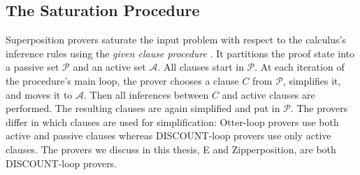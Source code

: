 \subsection{The Saturation Procedure}
\label{sec:pre:saturation}

Superposition provers saturate the input problem with respect to the calculus's
inference rules using the \emph{given clause procedure}
\cite{mcw-1997-otter,adf-1995-discount}. It partitions the proof state into a
passive set $\mathcal{P}$ and an active set $\mathcal{A}$. All clauses start in
$\mathcal{P}$. At each iteration of the procedure's main loop, the prover
chooses a clause $C$ from $\mathcal{P}$, simplifies it, and moves it to
$\mathcal{A}$. Then all inferences between $C$ and active clauses are performed.
The resulting clauses are again simplified and put in $\mathcal{P}$.
The provers differ in which clauses are used for simplification: Otter-loop
\cite{mcw-1997-otter} provers use both active and passive clauses whereas
DISCOUNT-loop \cite{adf-1995-discount} provers use only active clauses.
The provers we discuss in this thesis, E and Zipperposition, are both DISCOUNT-loop provers.

